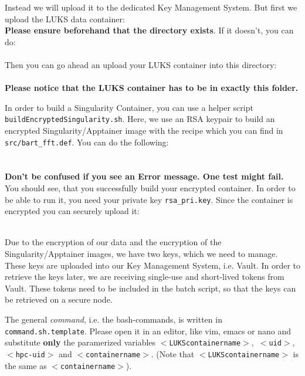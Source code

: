 \documentclass[paper=a4]{scrartcl}
\begin{document}
Instead we will upload it to the dedicated Key Management System. 
But first we upload the LUKS data container:\\
\textbf{Please ensure beforehand that the directory exists}.
If it doesn't, you can do: \\
 \\
Then you can go ahead an upload your LUKS container into this directory: \\
 \\
\textbf{Please notice that the LUKS container has to be in exactly this folder.}

In order to build a Singularity Container, you can use a helper script \texttt{buildEncryptedSingularity.sh}. 
Here, we use an RSA keypair to build an encrypted Singularity/Apptainer image with the recipe which you can find in \texttt{src/bart\_fft.def}. 
You can do the following: \\
 \\
 \\
\textbf{Don't be confused if you see an Error message. One test might fail.} \\
You should see, that you successfully build your encrypted container. In order to be able to run it, you need your private key \texttt{rsa\_pri.key}. 
Since the container is encrypted you can securely upload it: \\
 \\

Due to the encryption of our data and the encryption of the Singularity/Apptainer images, we have two keys, which we need to manage. 
These keys are uploaded into our Key Management System, i.e. Vault. 
In order to retrieve the keys later, we are receiving single-use and short-lived tokens from Vault. 
These tokens need to be included in the batch script, so that the keys can be retrieved on a secure node. 

The general \textit{command}, i.e. the bash-commands, is written in \texttt{command.sh.template}. 
Please open it in an editor, like vim, emacs or nano and substitute \textbf{only} the paramerized variables \texttt{$<$LUKScontainername$>$},\texttt{ $<$uid$>$}, \\\texttt{$<$hpc-uid$>$} and \texttt{$<$containername$>$}. 
(Note that \texttt{$<$LUKScontainername$>$} is the same as \texttt{$<$containername$>$}).
\end{document}
